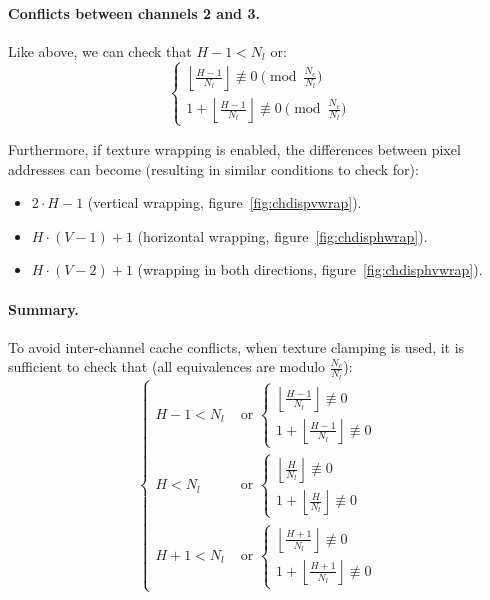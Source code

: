 \documentclass[a4paper,11pt]{kthesis}
\begin{document}
\paragraph{Conflicts between channels 2 and 3.}
Like above, we can check that $H-1 < N_{l}$ or:
\begin{equation}
\begin{cases}
\left\lfloor \frac{H-1}{N_{l}} \right\rfloor \not \equiv 0 \pmod{\frac{N_{c}}{N_{l}}} \\
1 + \left\lfloor \frac{H-1}{N_{l}} \right\rfloor \not \equiv 0 \pmod{\frac{N_{c}}{N_{l}}}
\end{cases}
\end{equation}

Furthermore, if texture wrapping is enabled, the differences between pixel addresses can become (resulting in similar conditions to check for):
\begin{itemize}
\item $2 \cdot H - 1$ (vertical wrapping, figure~\ref{fig:chdispvwrap}).
\item $H \cdot (V - 1) + 1$ (horizontal wrapping, figure~\ref{fig:chdisphwrap}).
\item $H \cdot (V - 2) + 1$ (wrapping in both directions, figure~\ref{fig:chdisphvwrap}).
\end{itemize}

\paragraph{Summary.}
To avoid inter-channel cache conflicts, when texture clamping is used, it is sufficient to check that (all equivalences are modulo $\frac{N_{c}}{N_{l}}$):
\begin{equation}\label{eq:icccsum}
\boxed{
\begin{cases}
H-1 < N_{l} & \textrm{ or } \begin{cases}
\left\lfloor \frac{H-1}{N_{l}} \right\rfloor \not \equiv 0 \\
1 + \left\lfloor \frac{H-1}{N_{l}} \right\rfloor \not \equiv 0
\end{cases} \\
H < N_{l} & \textrm{ or } \begin{cases}
\left\lfloor \frac{H}{N_{l}} \right\rfloor \not \equiv 0 \\
1 + \left\lfloor \frac{H}{N_{l}} \right\rfloor \not \equiv 0
\end{cases} \\
H+1 < N_{l} & \textrm{ or } \begin{cases}
\left\lfloor \frac{H+1}{N_{l}} \right\rfloor \not \equiv 0 \\
1 + \left\lfloor \frac{H+1}{N_{l}} \right\rfloor \not \equiv 0
\end{cases}
\end{cases}
}
\end{equation}
\end{document}
